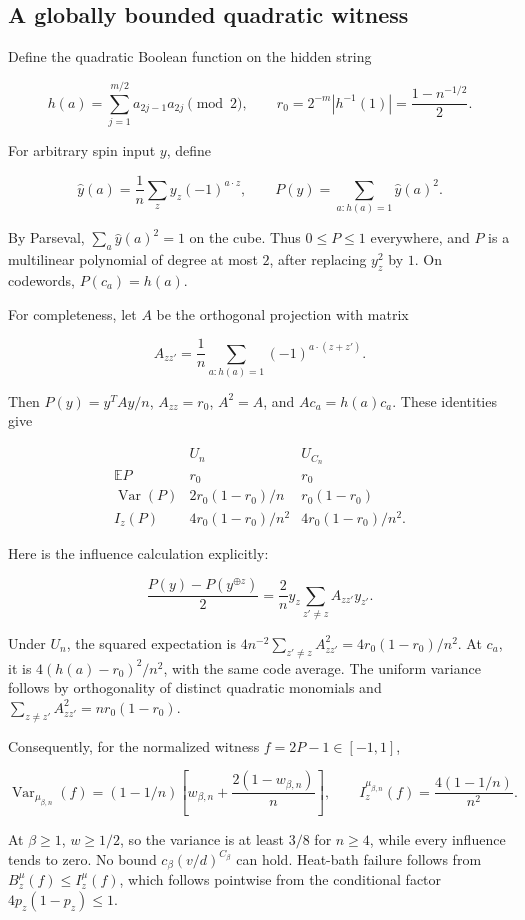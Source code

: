 \subsection{A globally bounded quadratic witness}\label{qm:a-globally-bounded-quadratic-witness}

Define the quadratic Boolean function on the hidden string

\[
h(a)=\sum_{j=1}^{m/2}a_{2j-1}a_{2j}\pmod2,
\qquad r_0=2^{-m}|h^{-1}(1)|=\frac{1-n^{-1/2}}2.
\]

For arbitrary spin input \(y\), define

\[
\widehat y(a)=\frac1n\sum_z y_z(-1)^{a\cdot z},
\qquad P(y)=\sum_{a:h(a)=1}\widehat y(a)^2.
\]

By Parseval, \(\sum_a\widehat y(a)^2=1\) on the cube. Thus \(0\le P\le1\) everywhere, and \(P\) is a multilinear polynomial of degree at most \(2\), after replacing \(y_z^2\) by \(1\). On codewords, \(P(c_a)=h(a)\).

For completeness, let \(A\) be the orthogonal projection with matrix

\[
A_{zz'}=\frac1n\sum_{a:h(a)=1}(-1)^{a\cdot(z+z')}.
\]

Then \(P(y)=y^TAy/n\), \(A_{zz}=r_0\), \(A^2=A\), and \(Ac_a=h(a)c_a\). These identities give

\[
\begin{array}{c|cc}
&U_n&U_{C_n}\\\hline
\mathbb EP&r_0&r_0\\
\operatorname{Var}(P)&2r_0(1-r_0)/n&r_0(1-r_0)\\
I_z(P)&4r_0(1-r_0)/n^2&4r_0(1-r_0)/n^2.
\end{array}
\]

Here is the influence calculation explicitly:

\[
\frac{P(y)-P(y^{\oplus z})}{2}
=\frac{2}{n}y_z\sum_{z'\ne z}A_{zz'}y_{z'}.
\]

Under \(U_n\), the squared expectation is \(4n^{-2}\sum_{z'\ne z}A_{zz'}^2=4r_0(1-r_0)/n^2\). At \(c_a\), it is \(4(h(a)-r_0)^2/n^2\), with the same code average. The uniform variance follows by orthogonality of distinct quadratic monomials and \(\sum_{z\ne z'}A_{zz'}^2=nr_0(1-r_0)\).

Consequently, for the normalized witness \(f=2P-1\in[-1,1]\),

\[
\boxed{\displaystyle
\operatorname{Var}_{\mu_{\beta,n}}(f)
=(1-1/n)\left[w_{\beta,n}+\frac{2(1-w_{\beta,n})}{n}\right],
\qquad I_z^{\mu_{\beta,n}}(f)=\frac{4(1-1/n)}{n^2}.}
\]

At \(\beta\ge1\), \(w\ge1/2\), so the variance is at least \(3/8\) for \(n\ge4\), while every influence tends to zero. No bound \(c_\beta(v/d)^{C_\beta}\) can hold. Heat-bath failure follows from \(B_z^\mu(f)\le I_z^\mu(f)\), which follows pointwise from the conditional factor \(4p_z(1-p_z)\le1\).

